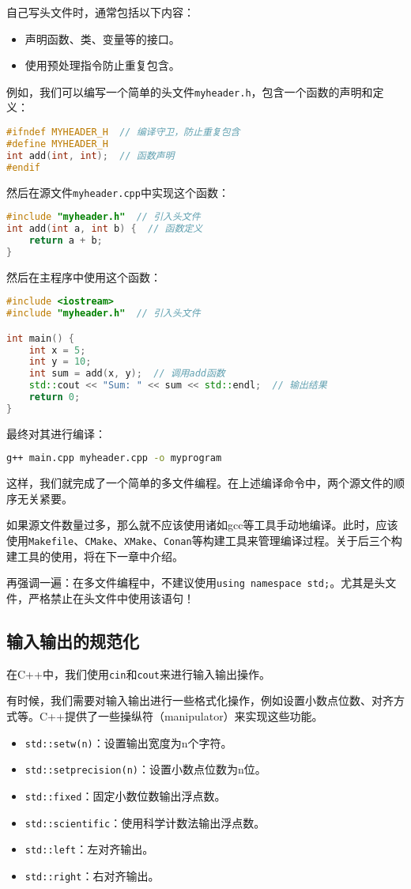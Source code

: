 自己写头文件时，通常包括以下内容：
\begin{itemize}
  \item 声明函数、类、变量等的接口。
  \item 使用预处理指令防止重复包含。
\end{itemize}
例如，我们可以编写一个简单的头文件\texttt{myheader.h}，包含一个函数的声明和定义：
\begin{lstlisting}[language=C++]
#ifndef MYHEADER_H  // 编译守卫，防止重复包含
#define MYHEADER_H
int add(int, int);  // 函数声明
#endif
\end{lstlisting}
然后在源文件\texttt{myheader.cpp}中实现这个函数：
\begin{lstlisting}[language=C++]
#include "myheader.h"  // 引入头文件
int add(int a, int b) {  // 函数定义
    return a + b;
}
\end{lstlisting}
然后在主程序中使用这个函数：
\begin{lstlisting}[language=C++]
#include <iostream>
#include "myheader.h"  // 引入头文件

int main() {
    int x = 5;
    int y = 10;
    int sum = add(x, y);  // 调用add函数
    std::cout << "Sum: " << sum << std::endl;  // 输出结果
    return 0;
}
\end{lstlisting}
最终对其进行编译：
\begin{lstlisting}[language=bash]
g++ main.cpp myheader.cpp -o myprogram
\end{lstlisting}
这样，我们就完成了一个简单的多文件编程。在上述编译命令中，两个源文件的顺序无关紧要。

如果源文件数量过多，那么就不应该使用诸如gcc等工具手动地编译。此时，应该使用\texttt{Makefile}、\texttt{CMake}、\texttt{XMake}、\texttt{Conan}等构建工具来管理编译过程。关于后三个构建工具的使用，将在下一章中介绍。

再强调一遍：在多文件编程中，不建议使用\texttt{using namespace std;}。尤其是头文件，严格禁止在头文件中使用该语句！

\subsection{输入输出的规范化}

在C++中，我们使用\texttt{cin}和\texttt{cout}来进行输入输出操作。

有时候，我们需要对输入输出进行一些格式化操作，例如设置小数点位数、对齐方式等。C++提供了一些操纵符（manipulator）来实现这些功能。
\begin{itemize}
  \item \texttt{std::setw(n)}：设置输出宽度为n个字符。
  \item \texttt{std::setprecision(n)}：设置小数点位数为n位。
  \item \texttt{std::fixed}：固定小数位数输出浮点数。
  \item \texttt{std::scientific}：使用科学计数法输出浮点数。
  \item \texttt{std::left}：左对齐输出。
  \item \texttt{std::right}：右对齐输出。
\end{itemize}


